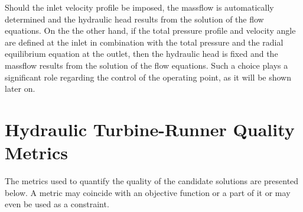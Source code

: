 Should the inlet velocity profile be imposed, the massflow is automatically determined and the hydraulic head results from the solution of the flow equations. On the the other hand, if the total pressure profile and velocity angle are defined at the inlet in combination with the total pressure and the radial equilibrium equation at the outlet, then the hydraulic head is fixed and the massflow results from the solution of the flow equations. Such a choice  plays a significant role regarding the control of the operating point, as it will be shown later on.        

 








\section{Hydraulic Turbine-Runner Quality Metrics}
\label{metrics}
The metrics used to quantify the quality of the candidate solutions are presented below. A metric may coincide with an objective function or a part of it or may even be used as a constraint.

